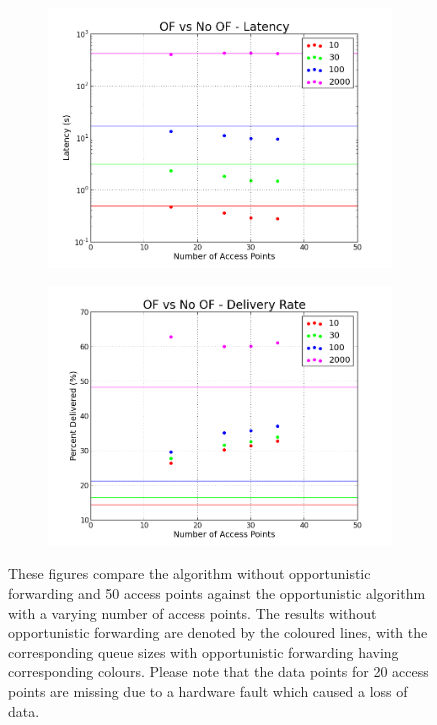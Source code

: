         \begin{figure}
            \centering
            \begin{subfigure}{0.5\textwidth}
                \centering
                \includegraphics[width=\linewidth]{./images/OF_vs_No_OF_Latency.png}
                \caption{}
                \label{fig:of_num_aps_latency}
            \end{subfigure}%
            \begin{subfigure}{0.5\textwidth}
                \includegraphics[width=\linewidth]{./images/OF_vs_No_OF_Percentage.png}
                \caption{}
                \label{fig:of_num_aps_percentage}
            \end{subfigure}
            \caption{These figures compare the algorithm without opportunistic forwarding and 50 access points against the opportunistic algorithm with a varying number of access points. The results without opportunistic forwarding are denoted by the coloured lines, with the corresponding queue sizes with opportunistic forwarding having corresponding colours. Please note that the data points for 20 access points are missing due to a hardware fault which caused a loss of data.}
            \label{fig:of_num_aps}
        \end{figure}


